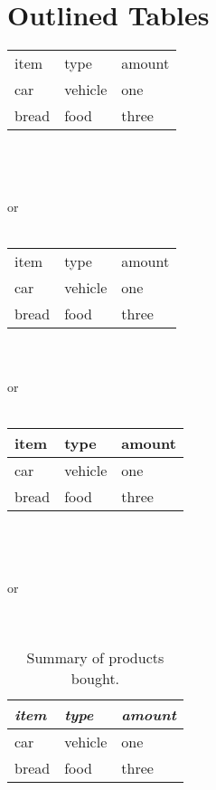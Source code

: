 \documentclass{article}
\begin{document}
\section{Outlined Tables}
\begin{tabular}{|l|l|l|}
item & type & amount\\
car & vehicle & one\\
bread & food & three
\end{tabular}\\
\\\\or\\\\
\begin{tabular}{|lll|}
item & type & amount\\
car & vehicle & one\\
bread & food & three
\end{tabular}
\\\\or\\\\
\begin{tabular}{|l|l|l|}
\hline
item & type & amount\\
\hline
car & vehicle & one\\
\hline
bread & food & three\\
\hline
\end{tabular}\\
\\\\or\\\\\\

\begin{table}
\centering
\begin{tabular}{lll}
\textit{item} & \textit{type} & \textit{amount}\\
\hline
car & vehicle & one\\
bread & food & three\\
\end{tabular}
\caption{Summary of products bought.}
\end{table}
\end{document}
